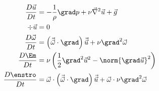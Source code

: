 \begin{subequations}
\begin{align}
	\frac{D \vec{u}}{D t}
	&=
	- \frac{1}{\rho} \grad p
	+
	\nu  \vec{\nabla}^{2} \vec{u}
	+
	 \vec{g}
	 \\
	\div \vec{u}
	&=
	0
	\label{eq:konti2}\\
	\frac{D \vec{\omega}}{D t}
	&=
	\left( \vec{\vec{\omega}} \cdot \grad \right) \vec{\vec{u}}
	+
	\nu \grad^2 \vec{\omega}
	\label{eq:vort2}\\
	 \addtocounter{equation}{+1}
	\frac{D \Em}{D t}
	&=
	\nu\left(
	\frac{1}{2}\grad^2 \vec{u}^2 - \norm{\grad \vec{u}}^2
	\right)
	\label{eq:Emech2}\\
	\frac{D \enstro}{D t}
	&=
	\vec{\omega}\cdot \left( \vec{\vec{\omega} } \cdot \grad \right) \vec{\vec{u}}
	+
	\vec{\omega} \cdot  \nu \grad^{2} \vec{\omega}
	\label{eq:enst2}
\end{align}
\end{subequations}
